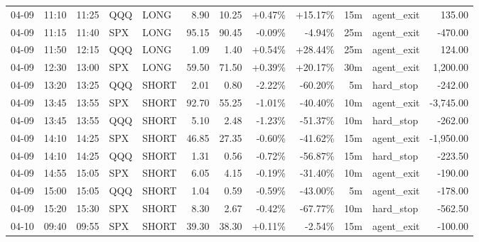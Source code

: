 \documentclass[11pt,a4paper]{article}
\begin{document}
\begin{center}
\begin{longtable}{>{\color{txtmain}}l l l l l r r r r r >{\color{txtmain}}l r}
04-09 & 11:10 & 11:25 & QQQ & LONG & 8.90 & 10.25 & \textcolor{wingreen}{+0.47\%} & \textcolor{wingreen}{+15.17\%} & 15m & agent\_exit & \textcolor{wingreen}{135.00} \\
04-09 & 11:15 & 11:40 & SPX & LONG & 95.15 & 90.45 & \textcolor{lossred}{-0.09\%} & \textcolor{lossred}{-4.94\%} & 25m & agent\_exit & \textcolor{lossred}{-470.00} \\
04-09 & 11:50 & 12:15 & QQQ & LONG & 1.09 & 1.40 & \textcolor{wingreen}{+0.54\%} & \textcolor{wingreen}{+28.44\%} & 25m & agent\_exit & \textcolor{wingreen}{124.00} \\
04-09 & 12:30 & 13:00 & SPX & LONG & 59.50 & 71.50 & \textcolor{wingreen}{+0.39\%} & \textcolor{wingreen}{+20.17\%} & 30m & agent\_exit & \textcolor{wingreen}{1,200.00} \\
04-09 & 13:20 & 13:25 & QQQ & SHORT & 2.01 & 0.80 & \textcolor{lossred}{-2.22\%} & \textcolor{lossred}{-60.20\%} & 5m & hard\_stop & \textcolor{lossred}{-242.00} \\
04-09 & 13:45 & 13:55 & SPX & SHORT & 92.70 & 55.25 & \textcolor{lossred}{-1.01\%} & \textcolor{lossred}{-40.40\%} & 10m & agent\_exit & \textcolor{lossred}{-3,745.00} \\
04-09 & 13:45 & 13:55 & QQQ & SHORT & 5.10 & 2.48 & \textcolor{lossred}{-1.23\%} & \textcolor{lossred}{-51.37\%} & 10m & hard\_stop & \textcolor{lossred}{-262.00} \\
04-09 & 14:10 & 14:25 & SPX & SHORT & 46.85 & 27.35 & \textcolor{lossred}{-0.60\%} & \textcolor{lossred}{-41.62\%} & 15m & agent\_exit & \textcolor{lossred}{-1,950.00} \\
04-09 & 14:10 & 14:25 & QQQ & SHORT & 1.31 & 0.56 & \textcolor{lossred}{-0.72\%} & \textcolor{lossred}{-56.87\%} & 15m & hard\_stop & \textcolor{lossred}{-223.50} \\
04-09 & 14:55 & 15:05 & SPX & SHORT & 6.05 & 4.15 & \textcolor{lossred}{-0.19\%} & \textcolor{lossred}{-31.40\%} & 10m & agent\_exit & \textcolor{lossred}{-190.00} \\
04-09 & 15:00 & 15:05 & QQQ & SHORT & 1.04 & 0.59 & \textcolor{lossred}{-0.59\%} & \textcolor{lossred}{-43.00\%} & 5m & agent\_exit & \textcolor{lossred}{-178.00} \\
04-09 & 15:20 & 15:30 & SPX & SHORT & 8.30 & 2.67 & \textcolor{lossred}{-0.42\%} & \textcolor{lossred}{-67.77\%} & 10m & hard\_stop & \textcolor{lossred}{-562.50} \\
04-10 & 09:40 & 09:55 & SPX & SHORT & 39.30 & 38.30 & \textcolor{wingreen}{+0.11\%} & \textcolor{lossred}{-2.54\%} & 15m & agent\_exit & \textcolor{lossred}{-100.00} \\

\end{longtable}
\end{center}
\end{document}
